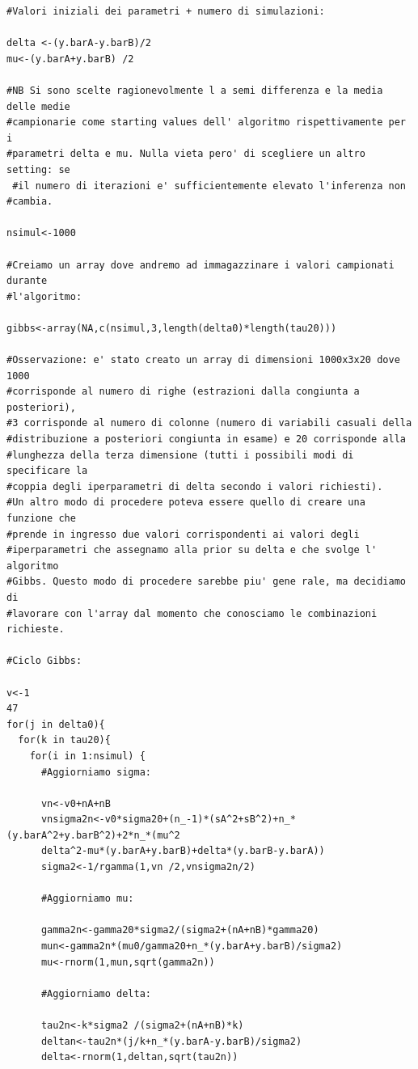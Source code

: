 \begin{itemize}
\begin{lstlisting}[style=R]
#Valori iniziali dei parametri + numero di simulazioni:

delta <-(y.barA-y.barB)/2
mu<-(y.barA+y.barB) /2

#NB Si sono scelte ragionevolmente l a semi differenza e la media delle medie
#campionarie come starting values dell' algoritmo rispettivamente per i
#parametri delta e mu. Nulla vieta pero' di scegliere un altro setting: se
 #il numero di iterazioni e' sufficientemente elevato l'inferenza non
#cambia.

nsimul<-1000

#Creiamo un array dove andremo ad immagazzinare i valori campionati durante
#l'algoritmo:

gibbs<-array(NA,c(nsimul,3,length(delta0)*length(tau20)))

#Osservazione: e' stato creato un array di dimensioni 1000x3x20 dove 1000
#corrisponde al numero di righe (estrazioni dalla congiunta a posteriori),
#3 corrisponde al numero di colonne (numero di variabili casuali della
#distribuzione a posteriori congiunta in esame) e 20 corrisponde alla
#lunghezza della terza dimensione (tutti i possibili modi di specificare la
#coppia degli iperparametri di delta secondo i valori richiesti).
#Un altro modo di procedere poteva essere quello di creare una funzione che
#prende in ingresso due valori corrispondenti ai valori degli
#iperparametri che assegnamo alla prior su delta e che svolge l' algoritmo
#Gibbs. Questo modo di procedere sarebbe piu' gene rale, ma decidiamo di
#lavorare con l'array dal momento che conosciamo le combinazioni richieste.

#Ciclo Gibbs:

v<-1
47
for(j in delta0){
  for(k in tau20){
    for(i in 1:nsimul) {
      #Aggiorniamo sigma:

      vn<-v0+nA+nB
      vnsigma2n<-v0*sigma20+(n_-1)*(sA^2+sB^2)+n_*(y.barA^2+y.barB^2)+2*n_*(mu^2
      delta^2-mu*(y.barA+y.barB)+delta*(y.barB-y.barA))
      sigma2<-1/rgamma(1,vn /2,vnsigma2n/2)
      
      #Aggiorniamo mu:
      
      gamma2n<-gamma20*sigma2/(sigma2+(nA+nB)*gamma20)
      mun<-gamma2n*(mu0/gamma20+n_*(y.barA+y.barB)/sigma2)
      mu<-rnorm(1,mun,sqrt(gamma2n))
      
      #Aggiorniamo delta:
      
      tau2n<-k*sigma2 /(sigma2+(nA+nB)*k)
      deltan<-tau2n*(j/k+n_*(y.barA-y.barB)/sigma2)
      delta<-rnorm(1,deltan,sqrt(tau2n))
      

\end{lstlisting}
\end{itemize}
